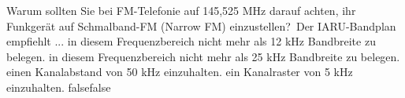     {Warum sollten Sie bei FM-Telefonie auf 145,525 MHz darauf achten, ihr Funkgerät auf Schmalband-FM (Narrow FM) einzustellen? Der IARU-Bandplan empfiehlt ...}
    {in diesem Frequenzbereich nicht mehr als 12 kHz Bandbreite zu belegen.}
    {in diesem Frequenzbereich nicht mehr als 25 kHz Bandbreite zu belegen.}
    {einen Kanalabstand von 50 kHz einzuhalten.}
    {ein Kanalraster von 5 kHz einzuhalten.}
    {false}{false}